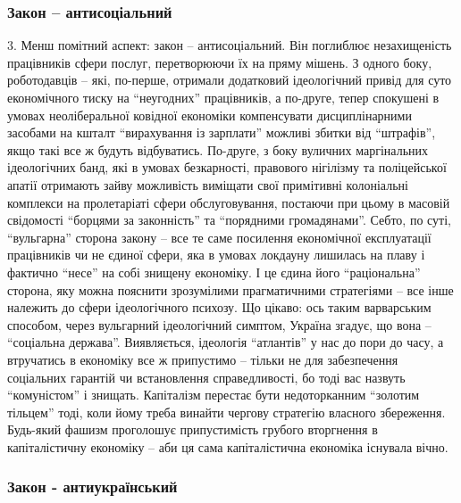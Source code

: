 \subsubsection{Закон – антисоціальний}

3. Менш помітний аспект: закон – антисоціальний. Він поглиблює незахищеність
працівників сфери послуг, перетворюючи їх на пряму мішень. З одного боку,
роботодавців – які, по-перше, отримали додатковий ідеологічний привід для суто
економічного тиску на \enquote{неугодних} працівників, а по-друге, тепер спокушені в
умовах неоліберальної ковідної економіки компенсувати дисциплінарними засобами
на кшталт \enquote{вирахування із зарплати} можливі збитки від \enquote{штрафів}, якщо такі все
ж будуть відбуватись. По-друге, з боку вуличних маргінальних ідеологічних банд,
які в умовах безкарності, правового нігілізму та поліцейської апатії отримають
зайву можливість виміщати свої примітивні колоніальні комплекси на пролетаріаті
сфери обслуговування, постаючи при цьому в масовій свідомості \enquote{борцями за
законність} та \enquote{порядними громадянами}. Себто, по суті, \enquote{вульгарна} сторона
закону – все те саме посилення економічної експлуатації працівників чи не
єдиної сфери, яка в умовах локдауну лишилась на плаву і фактично \enquote{несе} на собі
знищену економіку. І це єдина його \enquote{раціональна} сторона, яку можна пояснити
зрозумілими прагматичними стратегіями – все інше належить до сфери
ідеологічного психозу. Що цікаво: ось таким варварським способом, через
вульгарний ідеологічний симптом, Україна згадує, що вона – \enquote{соціальна держава}.
Виявляється, ідеологія \enquote{атлантів} у нас до пори до часу, а втручатись в
економіку все ж припустимо – тільки не для забезпечення соціальних гарантій чи
встановлення справедливості, бо тоді вас назвуть \enquote{комуністом} і знищать.
Капіталізм перестає бути  недоторканним \enquote{золотим тільцем} тоді, коли йому треба
винайти чергову стратегію власного збереження. Будь-який фашизм проголошує
припустимість грубого вторгнення в капіталістичну економіку – аби ця сама
капіталістична економіка існувала вічно.

\subsubsection{Закон - антиукраїнський}

